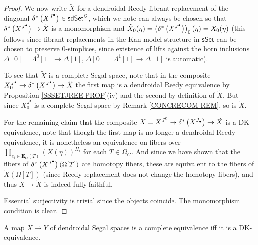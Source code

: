 \documentclass[a4paper,10pt
]{article}%
\begin{document}
\begin{proof}
We now write $\tilde{X}$ for a dendroidal Reedy fibrant replacement of the diagonal 
$\delta^{\**} \left(X^{J^{\bullet}}\right) \in \mathsf{sdSet}^G$,
which we note can always be chosen so that
$\delta^{\**} \left(X^{J^{\bullet}}\right) \to \tilde{X}$
is a monomorphism and
$\tilde{X}_0(\eta) = 
\left(\delta^{\**} \left(X^{J^{\bullet}}\right)\right)_0(\eta)=
X_0(\eta)$ (this follows since fibrant replacements in the Kan model structure in $\mathsf{sSet}$ can be chosen to preserve $0$-simplices, since existence of lifts against the horn inclusions
$\Delta[0]=\Lambda^0[1]\to \Delta[1]$,
$\Delta[0]=\Lambda^1[1]\to \Delta[1]$
is automatic).

To see that $\tilde{X}$ is a complete Segal space, note that in the composite
$X_0^{J^{\bullet}} \to
\delta^{\**}\left( X^{J^{\bullet}} \right)
\to \tilde{X}$
the first map is a dendroidal Reedy equivalence by Proposition \ref{SSSETJREE PROP}(iv) and the second by definition of $\tilde{X}$.
But since $X_0^{J^{\bullet}}$ is a complete Segal space by Remark \ref{CONCRECOM REM}, so is $\tilde{X}$.

For the remaining claim that the composite
$X = X^{J^{0}} \to 
\delta^{\**}\left( X^{J_{\bullet}} \right)
\to \tilde{X}$
is a DK equivalence, 
note that though
the first map is no longer a dendroidal Reedy equivalence, 
it is nonetheless an equivalence
on fibers over
$\prod_{e_i \in \boldsymbol{E}_G(T)} \left(X(\eta)\right)^{H_i}$
for each $T\in \Omega_G$.
And since we have shown that the fibers of
$\delta^{\**}\left( X^{J^{\bullet}} \right)(\Omega[T])$
 are homotopy fibers, these are equivalent to the fibers of $\tilde{X}(\Omega[T])$ (since Reedy replacement does not change the homotopy fibers), 
and thus $X \to \tilde{X}$ is indeed fully faithful.

Essential surjectivity is trivial since the objects coincide.
The monomorphism condition is clear.
\end{proof}


\begin{theorem}\label{COMPIFFDK THM}
	A map $X \to Y$ of dendroidal Segal spaces is a complete equivalence iff it is a DK-equivalence.
\end{theorem}
\end{document}
